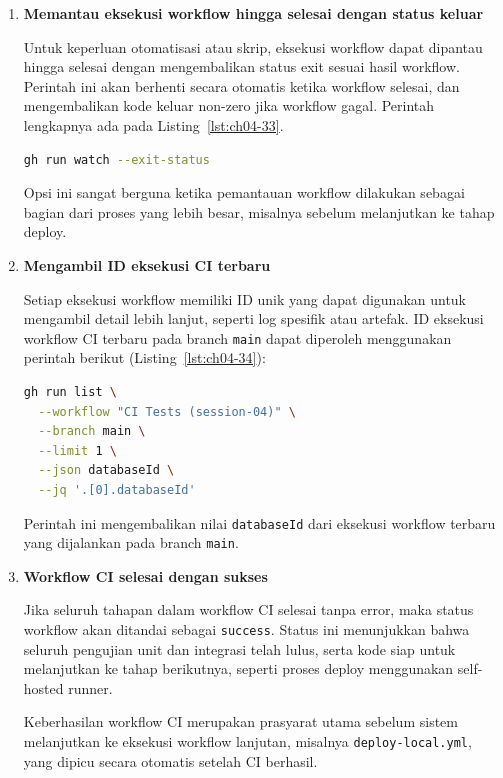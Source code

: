 \begin{enumerate}
\item \textbf{Memantau eksekusi workflow hingga selesai dengan status keluar}

Untuk keperluan otomatisasi atau skrip, eksekusi workflow dapat dipantau
hingga selesai dengan mengembalikan status exit sesuai hasil workflow.
Perintah ini akan berhenti secara otomatis ketika workflow selesai,
dan mengembalikan kode keluar non-zero jika workflow gagal. Perintah lengkapnya ada pada Listing~\ref{lst:ch04-33}.

\begin{lstlisting}[language=bash, caption={Memantau workflow di GitHub (7)}, label={lst:ch04-33}]
gh run watch --exit-status
\end{lstlisting}

Opsi ini sangat berguna ketika pemantauan workflow dilakukan sebagai bagian
dari proses yang lebih besar, misalnya sebelum melanjutkan ke tahap deploy.

\item \textbf{Mengambil ID eksekusi CI terbaru}

Setiap eksekusi workflow memiliki ID unik yang dapat digunakan untuk
mengambil detail lebih lanjut, seperti log spesifik atau artefak.
ID eksekusi workflow CI terbaru pada branch \texttt{main} dapat diperoleh
menggunakan perintah berikut (Listing~\ref{lst:ch04-34}):

\begin{lstlisting}[language=bash, caption={Memantau workflow di GitHub (8)}, label={lst:ch04-34}]
gh run list \
  --workflow "CI Tests (session-04)" \
  --branch main \
  --limit 1 \
  --json databaseId \
  --jq '.[0].databaseId'
\end{lstlisting}

Perintah ini mengembalikan nilai \texttt{databaseId} dari eksekusi workflow
terbaru yang dijalankan pada branch \texttt{main}.

\item \textbf{Workflow CI selesai dengan sukses}

Jika seluruh tahapan dalam workflow CI selesai tanpa error, maka status
workflow akan ditandai sebagai \texttt{success}. Status ini menunjukkan bahwa
seluruh pengujian unit dan integrasi telah lulus, serta kode siap untuk
melanjutkan ke tahap berikutnya, seperti proses deploy menggunakan
self-hosted runner.

Keberhasilan workflow CI merupakan prasyarat utama sebelum sistem
melanjutkan ke eksekusi workflow lanjutan, misalnya \texttt{deploy-local.yml},
yang dipicu secara otomatis setelah CI berhasil.



\end{enumerate}
